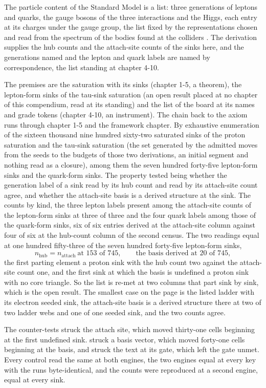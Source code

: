 \begin{chbridge}
The particle content of the Standard Model is a list: three generations of leptons and quarks, the gauge bosons of the three interactions and the Higgs, each entry at its charges under the gauge group, the list fixed by the representations chosen and read from the spectrum of the bodies found at the colliders \cite{Glashow1961,Weinberg1967}. The derivation supplies the hub counts and the attach-site counts of the sinks here, and the generations named and the lepton and quark labels are named by correspondence, the list standing at chapter 4-10.
\end{chbridge}
\begin{chproof}[census]
The premises are the saturation with its sinks (chapter 1-5, a theorem), the lepton-form sinks of the tau-sink saturation (an open result placed at no chapter of this compendium, read at its standing) and the list of the board at its names and grade tokens (chapter 4-10, an instrument). The chain back to the axiom runs through chapter 1-5 and the framework chapter. By exhaustive enumeration of the sixteen thousand nine hundred sixty-two saturated sinks of the proton saturation and the tau-sink saturation (the set generated by the admitted moves from the seeds to the budgets of those two derivations, an initial segment and nothing read as a closure), among them the seven hundred forty-five lepton-form sinks and the quark-form sinks. The property tested being whether the generation label of a sink read by its hub count and read by its attach-site count agree, and whether the attach-site basis is a derived structure at the sink. The counts by kind, the three lepton labels present among the attach-site counts of the lepton-form sinks at three of three and the four quark labels among those of the quark-form sinks, six of six entries derived at the attach-site column against four of six at the hub-count column of the second census. The two readings equal at one hundred fifty-three of the seven hundred forty-five lepton-form sinks,
\begin{equation}
n_{\text{hub}} = n_{\text{attach}} \ \text{at } 153 \text{ of } 745,\qquad \text{the basis derived at } 20 \text{ of } 745 ,
\end{equation}
the first parting element a proton sink with the hub count two against the attach-site count one, and the first sink at which the basis is undefined a proton sink with no core triangle. So the list is re-met at two columns that part sink by sink, which is the open result. The smallest case on the page is the listed ladder with its electron seeded sink, the attach-site basis is a derived structure there at two of two ladder webs and one of one seeded sink, and the two counts agree.

The counter-tests struck the attach site, which moved thirty-one cells beginning at the first undefined sink. struck a basis vector, which moved forty-one cells beginning at the basis, and struck the text at its gate, which left the gate unmet. Every control read the same at both engines, the two engines equal at every key with the runs byte-identical, and the counts were reproduced at a second engine, equal at every sink.
\end{chproof}
